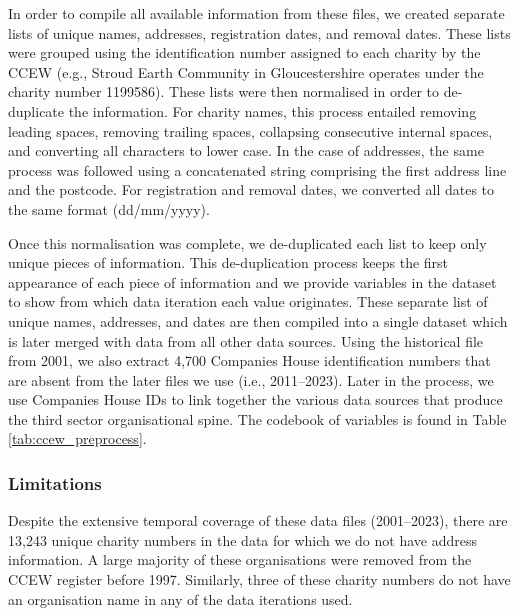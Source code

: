 \documentclass{article}
\begin{document}
In order to compile all available information from these files, we created separate lists of unique
names, addresses, registration dates, and removal dates. These lists were grouped using the
identification number assigned to each charity by the CCEW (e.g., Stroud Earth Community in
Gloucestershire operates under the charity number 1199586). These lists were then normalised
in order to de-duplicate the information. For charity names, this process entailed removing
leading   spaces,   removing   trailing   spaces,   collapsing   consecutive   internal   spaces,   and
converting all characters to lower case. In the case of addresses, the same process was followed
using a concatenated string comprising the first address line and the postcode. For registration
and removal dates, we converted all dates to the same format (dd/mm/yyyy).

Once this normalisation was complete, we de-duplicated each list to keep only unique pieces of
information.   This   de-duplication   process   keeps   the   first   appearance   of   each   piece   of
information and we provide variables in the dataset to show from which data iteration each
value originates. These separate list of unique names, addresses, and dates are then compiled
into a single dataset which is later merged with data from all other data sources. Using the
historical file from 2001, we also extract 4,700 Companies House identification numbers that
are absent from the later files we use (i.e., 2011–2023). Later in the process, we use Companies
House IDs to link together the various data sources that produce the third sector organisational
spine.
The codebook of variables is found in Table \ref{tab:ccew_preprocess}.

\subsubsection{Limitations }
Despite the extensive temporal coverage of these data files (2001–2023), there are 13,243
unique charity numbers in the data for which we do not have address information. A large
majority of these organisations were removed from the CCEW register before 1997. Similarly,
three of these charity numbers do not have an organisation name in any of the data iterations
used. 
\end{document}
